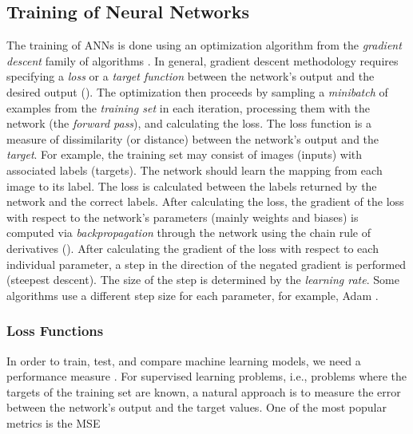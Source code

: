 \subsection{Training of Neural Networks}

The training of \acp{ANN} is done using an optimization algorithm from the \emph{gradient descent} family of algorithms \cite{Goodfellow-et-al-2016}. In general, gradient descent methodology requires specifying a \emph{loss} or a \emph{target function} between the network's output and the desired output (). The optimization then proceeds by sampling a \emph{minibatch} of examples from the \emph{training set} in each iteration, processing them with the network (the \emph{forward pass}), and calculating the loss. The loss function is a measure of dissimilarity (or distance) between the network's output and the \emph{target}. For example, the training set may consist of images (inputs) with associated labels (targets). The network should learn the mapping from each image to its label. The loss is calculated between the labels returned by the network and the correct labels. After calculating the loss, the gradient of the loss with respect to the network's parameters (mainly weights and biases) is computed via \emph{backpropagation} through the network using the chain rule of derivatives (). After calculating the gradient of the loss with respect to each individual parameter, a step in the direction of the negated gradient is performed (steepest descent). The size of the step is determined by the \emph{learning rate}. Some algorithms use a different step size for each parameter, for example, Adam \cite{Kingma2017}.

\subsubsection{Loss Functions}
\label{sec:loss_functions}

In order to train, test, and compare machine learning models, we need a performance measure \cite{Goodfellow-et-al-2016}. For supervised learning problems, i.e., problems where the targets of the training set are known, a natural approach is to measure the error between the network's output and the target values. One of the most popular metrics is the \ac{MSE}

